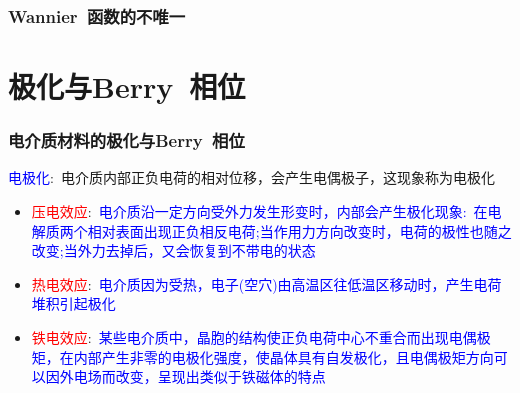 \documentclass[cjk,slidestop,compress,mathserif,blue]{beamer}
\begin{document}
\frame
{
	\frametitle{\textrm{Wannier~}函数的不唯一}
\begin{figure}[h!]
\centering
\hspace*{-0.35in}
\label{Non-local Wannier-function}
\end{figure}
}

\section{极化与\rm{Berry~}相位}
\frame
{
	\frametitle{电介质材料的极化与\textrm{Berry~}相位}
	\textcolor{blue}{电极化}:~电介质内部正负电荷的相对位移，会产生电偶极子，这现象称为电极化
	\begin{itemize}
\setlength{\itemsep}{10pt}
		\item \textcolor{red}{压电效应}:~\textcolor{blue}{电介质沿一定方向受外力发生形变时，内部会产生极化现象:~在电解质两个相对表面出现正负相反电荷;当作用力方向改变时，电荷的极性也随之改变;当外力去掉后，又会恢复到不带电的状态}
		\item \textcolor{red}{热电效应}:~\textcolor{blue}{电介质因为受热，电子(空穴)由高温区往低温区移动时，产生电荷堆积引起极化}
		\item \textcolor{red}{铁电效应}:~\textcolor{blue}{某些电介质中，晶胞的结构使正负电荷中心不重合而出现电偶极矩，在内部产生非零的电极化强度，使晶体具有自发极化，且电偶极矩方向可以因外电场而改变，呈现出类似于铁磁体的特点}
	\end{itemize}
}
\end{document}
